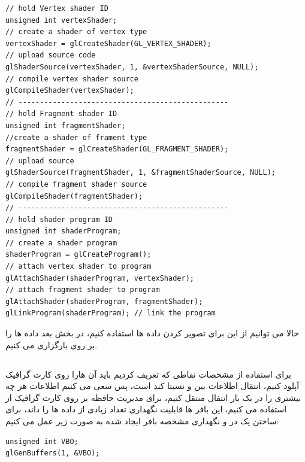 \documentclass[a4paper, 12pt]{book}
\newcommand{\lrit}[1]{\lr{\textit{#1}}}
\begin{document}
    \begin{LTR}
    \small
        \begin{lstlisting}[style=C++Style,caption=\lrit{compile and link shaders to shader program}]
// hold Vertex shader ID
unsigned int vertexShader;
// create a shader of vertex type
vertexShader = glCreateShader(GL_VERTEX_SHADER);
// upload source code
glShaderSource(vertexShader, 1, &vertexShaderSource, NULL);
// compile vertex shader source
glCompileShader(vertexShader);
// -------------------------------------------------
// hold Fragment shader ID
unsigned int fragmentShader;
//create a shader of frament type
fragmentShader = glCreateShader(GL_FRAGMENT_SHADER);
// upload source
glShaderSource(fragmentShader, 1, &fragmentShaderSource, NULL);
// compile fragment shader source
glCompileShader(fragmentShader);
// -------------------------------------------------
// hold shader program ID
unsigned int shaderProgram;
// create a shader program
shaderProgram = glCreateProgram();
// attach vertex shader to program
glAttachShader(shaderProgram, vertexShader);
// attach fragment shader to program
glAttachShader(shaderProgram, fragmentShader);
glLinkProgram(shaderProgram); // link the program
        \end{lstlisting}
    \end{LTR}
    \normalsize
    \vspace*{0.3cm}

    حالا می توانیم از این  برای تصویر کردن داده ها استفاده کنیم، در بخش بعد داده ها را بر روی  بارگزاری می کنیم.

\newpage
\subsection*{}
\noindent
\normalsize
    برای استفاده از مشخصات نقاطی که تعریف کردیم باید آن هارا روی  کارت گرافیک آپلود کنیم، انتقال اطلاعات بین  و  نسبتا کند است، پس سعی می کنیم اطلاعات هر چه بیشتری را در یک بار انتفال منتقل کنیم، برای مدیریت حافظه بر روی کارت گرافیک از  استفاده می کنیم، این بافر ها قابلیت نگهداری تعداد زیادی از داده ها را داند، برای ساختن یک  در  و نگهداری مشخصه بافر ایجاد شده به صورت زیر عمل می کنیم:

    \begin{LTR}
    \small
        \begin{lstlisting}[style=C++Style,caption=\lrit{creating a buffer object}]
unsigned int VBO;
glGenBuffers(1, &VBO);
        \end{lstlisting}
    \end{LTR}
    \normalsize
    \vspace*{0.3cm}
\end{document}

